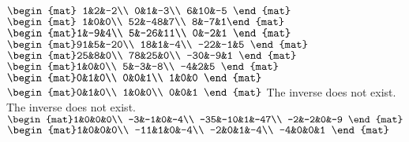 \begin{Answer}
\Question $\begin{mat} 1&2&-2\\  0&1&-3\\  6&10&-5 \end{mat}$
\Question $\begin{mat} 1&0&0\\  52&-48&7\\  8&-7&1\end{mat}$
\Question $\begin{mat}1&-9&4\\  5&-26&11\\  0&-2&1 \end{mat}$
\Question $\begin{mat}91&5&-20\\  18&1&-4\\  -22&-1&5 \end{mat}$
\Question $\begin{mat}25&8&0\\  78&25&0\\  -30&-9&1 \end{mat}$
\Question $\begin{mat}1&0&0\\  5&-3&-8\\  -4&2&5 \end{mat}$
\Question $\begin{mat}0&1&0\\  0&0&1\\  1&0&0 \end{mat}$
\Question $\begin{mat}0&1&0\\  1&0&0\\  0&0&1 \end{mat}$
\Question The inverse does not exist.
\Question The inverse does not exist.
\Question $\begin{mat}1&0&0&0\\  -3&-1&0&-4\\  -35&-10&1&-47\\  -2&-2&0&-9 \end{mat}$
\Question $\begin{mat}1&0&0&0\\  -11&1&0&-4\\  -2&0&1&-4\\  -4&0&0&1 \end{mat}$

\end{Answer}
